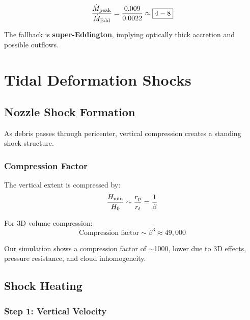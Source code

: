 \documentclass[twocolumn,amsmath,amssymb,prd,superscriptaddress,nofootinbib]{revtex4-2}
\begin{document}
\begin{equation}
    \frac{\dot{M}_{\rm peak}}{\dot{M}_{\rm Edd}} = \frac{0.009}{0.0022} \approx \boxed{4-8}
\end{equation}

The fallback is \textbf{super-Eddington}, implying optically thick accretion and possible outflows.

\section{Tidal Deformation Shocks}
\label{sec:shocks}

\subsection{Nozzle Shock Formation}
\label{sec:nozzle}

As debris passes through pericenter, vertical compression creates a standing shock structure.

\subsubsection{Compression Factor}

The vertical extent is compressed by:
\begin{equation}
    \frac{H_{\rm min}}{H_0} \sim \frac{r_p}{r_t} = \frac{1}{\beta}
    \label{eq:compression_factor}
\end{equation}

For 3D volume compression:
\begin{equation}
    \text{Compression factor} \sim \beta^3 \approx 49,000
\end{equation}

Our simulation shows a compression factor of $\sim$1000, lower due to 3D effects, pressure resistance, and cloud inhomogeneity.

\subsection{Shock Heating}
\label{sec:shock_heating}

\subsubsection{Step 1: Vertical Velocity}
\end{document}
